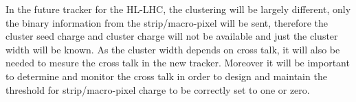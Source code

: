 

In the future tracker for the HL-LHC, the clustering will be largely different, only the binary information from the strip/macro-pixel will be sent, therefore the cluster seed charge and cluster charge will not be available and just the cluster width will be known. As the cluster width depends on cross talk, it will also be needed to mesure the cross talk in the new tracker. Moreover it will be important to determine and monitor the cross talk in order to design and maintain the threshold for strip/macro-pixel charge to be correctly set to one or zero.










